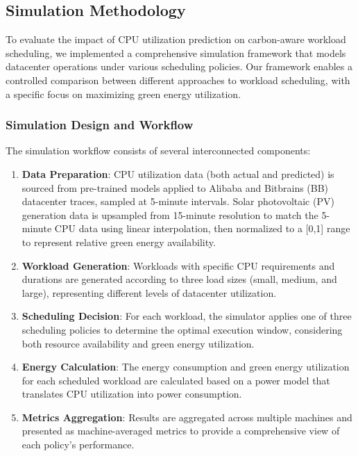 \subsection{Simulation Methodology}
\label{subsec:simulation_methodology}

To evaluate the impact of CPU utilization prediction on carbon-aware workload scheduling, we implemented a comprehensive simulation framework that models datacenter operations under various scheduling policies. Our framework enables a controlled comparison between different approaches to workload scheduling, with a specific focus on maximizing green energy utilization.

\subsubsection{Simulation Design and Workflow}
The simulation workflow consists of several interconnected components:

\begin{enumerate}
    \item \textbf{Data Preparation}: CPU utilization data (both actual and predicted) is sourced from pre-trained models applied to Alibaba and Bitbrains (BB) datacenter traces, sampled at 5-minute intervals. Solar photovoltaic (PV) generation data is upsampled from 15-minute resolution to match the 5-minute CPU data using linear interpolation, then normalized to a [0,1] range to represent relative green energy availability.
    
    \item \textbf{Workload Generation}: Workloads with specific CPU requirements and durations are generated according to three load sizes (small, medium, and large), representing different levels of datacenter utilization.
    
    \item \textbf{Scheduling Decision}: For each workload, the simulator applies one of three scheduling policies to determine the optimal execution window, considering both resource availability and green energy utilization.
    
    \item \textbf{Energy Calculation}: The energy consumption and green energy utilization for each scheduled workload are calculated based on a power model that translates CPU utilization into power consumption.
    
    \item \textbf{Metrics Aggregation}: Results are aggregated across multiple machines and presented as machine-averaged metrics to provide a comprehensive view of each policy's performance.
\end{enumerate}


